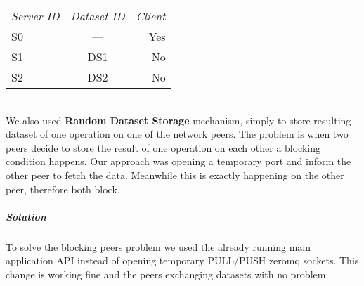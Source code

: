 \begin{tabular}{ l c r }
\em{Server ID} & \em{ Dataset ID} & \em{ Client} \\
S0 & --- & Yes \\
S1 & DS1 & No \\
S2 & DS2 & No \\
\end{tabular}\\

We also used \textbf{Random Dataset Storage} mechanism, simply to store resulting dataset of one operation on one of the network
peers. The problem is when two peers decide to store the result of one operation on each other a blocking condition happens. Our
approach was opening a temporary port and inform the other peer to fetch the data. Meanwhile this is exactly happening on the other
peer, therefore both block.

\subparagraph{Solution}
To solve the blocking peers problem we used the already running main application API instead of opening temporary PULL/PUSH zeromq 
sockets. This change is working fine and the peers exchanging datasets with no problem.
